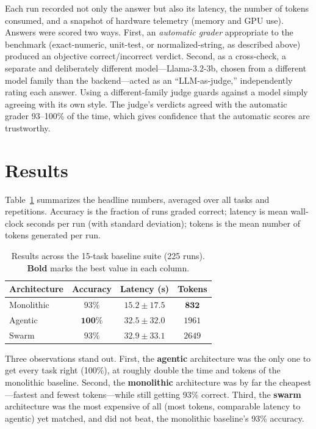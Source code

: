 \documentclass[sigconf,nonacm]{acmart}
\begin{document}
Each run recorded not only the answer but also its latency, the number of tokens
consumed, and a snapshot of hardware telemetry (memory and GPU use). Answers were
scored two ways. First, an \emph{automatic grader} appropriate to the benchmark
(exact-numeric, unit-test, or normalized-string, as described above) produced an
objective correct/incorrect verdict. Second, as a cross-check, a separate and
deliberately different model---Llama-3.2-3b, chosen from a different model family
than the backend---acted as an ``LLM-as-judge,'' independently rating each answer.
Using a different-family judge guards against a model simply agreeing with its own
style. The judge's verdicts agreed with the automatic grader 93--100\% of the
time, which gives confidence that the automatic scores are trustworthy.

\section{Results}
\label{sec:results}

Table~\ref{tab:results} summarizes the headline numbers, averaged over all tasks
and repetitions. Accuracy is the fraction of runs graded correct; latency is
mean wall-clock seconds per run (with standard deviation); tokens is the mean
number of tokens generated per run.

\begin{table}[h]
  \centering
  \caption{Results across the 15-task baseline suite (225 runs).
  \textbf{Bold} marks the best value in each column.}
  \label{tab:results}
  \begin{tabular}{lccc}
    \toprule
    \textbf{Architecture} & \textbf{Accuracy} & \textbf{Latency (s)} & \textbf{Tokens} \\
    \midrule
    Monolithic  & $93\%$         & $\mathbf{15.2 \pm 17.5}$ & $\mathbf{832}$ \\
    Agentic     & $\mathbf{100\%}$ & $32.5 \pm 32.0$ & $1961$ \\
    Swarm       & $93\%$         & $32.9 \pm 33.1$ & $2649$ \\
    \bottomrule
  \end{tabular}
\end{table}

Three observations stand out. First, the \textbf{agentic} architecture was the
only one to get every task right (100\%), at roughly double the time and tokens
of the monolithic baseline. Second, the \textbf{monolithic} architecture was by
far the cheapest---fastest and fewest tokens---while still getting 93\% correct.
Third, the \textbf{swarm} architecture was the most expensive of all (most tokens,
comparable latency to agentic) yet matched, and did not beat, the monolithic
baseline's 93\% accuracy.
\end{document}
